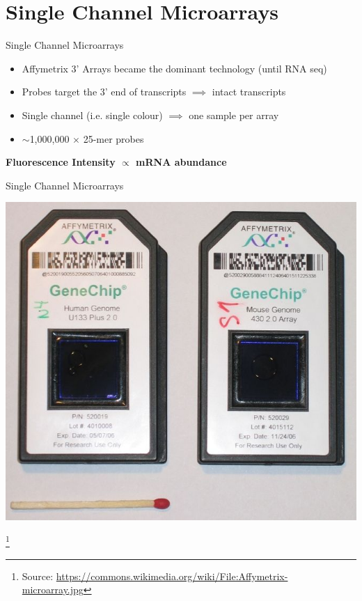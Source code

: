 \documentclass[aspectratio=169,11pt]{beamer}
\newcommand\blfootnote[1]{%
  \begingroup
  \renewcommand\thefootnote{}\footnote{#1}%
  \addtocounter{footnote}{-1}%
  \endgroup
}
\begin{document}
\section{Single Channel Microarrays}


\begin{frame}{Single Channel Microarrays}

	\begin{itemize}
		\item Affymetrix 3’ Arrays became the dominant technology (until RNA seq)
		\item Probes target the 3’ end of transcripts $\implies$ intact transcripts
		\item Single channel (i.e. single colour) $\implies$ one sample per array
		\item $\sim$1,000,000 $\times$ 25-mer probes
	\end{itemize}
	
	\begin{center}
		\textbf{Fluorescence Intensity $\propto$ mRNA abundance	}
	\end{center}

\end{frame}

\begin{frame}{Single Channel Microarrays}

	\begin{center}
	\includegraphics[scale=0.25]{figures/Affymetrix.jpg} 
	\end{center}
	
	\blfootnote{Source: \url{https://commons.wikimedia.org/wiki/File:Affymetrix-microarray.jpg}}

\end{frame}
\end{document}
